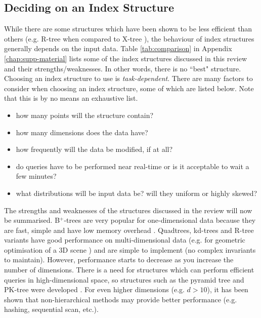 \subsection{Deciding on an Index Structure}
\label{sec:structure-decision}

While there are some structures which have been shown to be less efficient than others (e.g. R-tree when compared to X-tree \cite{x-tree}), the behaviour of index structures generally depends on the input data. Table \ref{tab:comparison} in Appendix \ref{chap:supp-material} lists some of the index structures discussed in this review and their strengths/weaknesses.
In other words, there is no ``best" structure. Choosing an index structure to use is \textit{task-dependent}. There are many factors to consider when choosing an index structure, some of which are listed below. Note that this is by no means an exhaustive list.
\begin{itemize}
	\item how many points will the structure contain?
	\item how many dimensions does the data have?
	\item how frequently will the data be modified, if at all?
	\item do queries have to be performed near real-time or is it acceptable to wait a few minutes?
	\item what distributions will be input data be? will they uniform or highly skewed?
\end{itemize}

The strengths and weaknesses of the structures discussed in the review will now be summarised. B${}^{+}$-trees are very popular for one-dimensional data because they are fast, simple and have low memory overhead \cite{ubiquitous-btree}. Quadtrees, kd-trees and R-tree variants have good performance on multi-dimensional data (e.g. for geometric optimisation of a 3D scene \cite{kd-tree-gpu}) and are simple to implement (no complex invariants to maintain). However, performance starts to decrease as you increase the number of dimensions. There is a need for structures which can perform efficient queries in high-dimensional space, so structures such as the pyramid tree and PK-tree were developed \cite{pk-tree, pyramid-tree}. For even higher dimensions (e.g. $d > 10$), it has been shown that non-hierarchical methods may provide better performance (e.g. hashing, sequential scan, etc.).